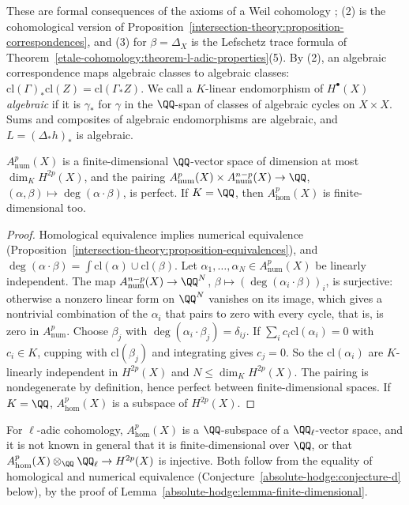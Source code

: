 These are formal consequences of the axioms of a Weil cohomology \cite{kleiman-1968}; (2) is the cohomological version of Proposition~\ref{intersection-theory:proposition-correspondences}, and (3)
for $\beta = \Delta_X$ is the Lefschetz trace formula of Theorem~\ref{etale-cohomology:theorem-l-adic-properties}(5). By (2), an algebraic correspondence maps algebraic classes to algebraic classes:
$\mathrm{cl}(\Gamma)_*\mathrm{cl}(Z) = \mathrm{cl}(\Gamma_*Z)$. We call a $K$-linear endomorphism of $H^\bullet(X)$ \emph{algebraic} if it is $\gamma_*$ for $\gamma$ in the $\QQ$-span of classes of algebraic cycles on
$X \times X$. Sums and composites of algebraic endomorphisms are algebraic, and $L = (\Delta_*h)_*$ is algebraic.

\begin{lemma}\label{absolute-hodge:lemma-finite-dimensional}
$A^p_{\mathrm{num}}(X)$ is a finite-dimensional $\QQ$-vector space of dimension at most $\dim_KH^{2p}(X)$, and the pairing $A^p_{\mathrm{num}}(X) \times A^{n-p}_{\mathrm{num}}(X) \to \QQ$,
$(\alpha, \beta) \mapsto \deg(\alpha \cdot \beta)$, is perfect. If $K = \QQ$, then $A^p_{\mathrm{hom}}(X)$ is finite-dimensional too.
\end{lemma}

\begin{proof}
Homological equivalence implies numerical equivalence (Proposition~\ref{intersection-theory:proposition-equivalences}), and $\deg(\alpha \cdot \beta) = \int\mathrm{cl}(\alpha) \cup \mathrm{cl}(\beta)$. Let
$\alpha_1, \ldots, \alpha_N \in A^p_{\mathrm{num}}(X)$ be linearly independent. The map $A^{n-p}_{\mathrm{num}}(X) \to \QQ^N$, $\beta \mapsto (\deg(\alpha_i \cdot \beta))_i$, is surjective: otherwise a nonzero linear form on $\QQ^N$
vanishes on its image, which gives a nontrivial combination of the $\alpha_i$ that pairs to zero with every cycle, that is, is zero in $A^p_{\mathrm{num}}$. Choose $\beta_j$ with $\deg(\alpha_i \cdot \beta_j) = \delta_{ij}$. If
$\sum_ic_i\mathrm{cl}(\alpha_i) = 0$ with $c_i \in K$, cupping with $\mathrm{cl}(\beta_j)$ and integrating gives $c_j = 0$. So the $\mathrm{cl}(\alpha_i)$ are $K$-linearly independent in $H^{2p}(X)$ and
$N \leq \dim_KH^{2p}(X)$. The pairing is nondegenerate by definition, hence perfect between finite-dimensional spaces. If $K = \QQ$, $A^p_{\mathrm{hom}}(X)$ is a subspace of $H^{2p}(X)$.
\end{proof}

\begin{remark}\label{absolute-hodge:remark-hom-finite}
For $\ell$-adic cohomology, $A^p_{\mathrm{hom}}(X)$ is a $\QQ$-subspace of a $\QQ_\ell$-vector space, and it is not known in general that it is finite-dimensional over $\QQ$, or that
$A^p_{\mathrm{hom}}(X) \otimes_\QQ\QQ_\ell \to H^{2p}(X)$ is injective. Both follow from the equality of homological and numerical equivalence (Conjecture~\ref{absolute-hodge:conjecture-d} below), by the
proof of Lemma~\ref{absolute-hodge:lemma-finite-dimensional}.
\end{remark}

